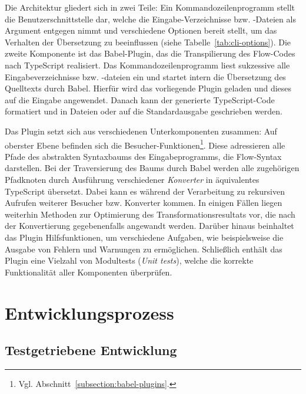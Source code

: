 Die Architektur gliedert sich in zwei Teile: Ein Kommandozeilenprogramm stellt die Benutzerschnittstelle dar, welche die Eingabe-Verzeichnisse bzw. -Dateien als Argument entgegen nimmt und verschiedene Optionen bereit stellt, um das Verhalten der Übersetzung zu beeinflussen (siehe Tabelle~\ref{tab:cli-options}). Die zweite Komponente ist das Babel-Plugin, das die Transpilierung des Flow-Codes nach TypeScript realisiert. Das Kommandozeilenprogramm liest sukzessive alle Eingabeverzeichnisse bzw. -dateien ein und startet intern die Übersetzung des Quelltexts durch Babel. Hierfür wird das vorliegende Plugin geladen und dieses auf die Eingabe angewendet. Danach kann der generierte TypeScript-Code formatiert und in Dateien oder auf die Standardausgabe geschrieben werden.

Das Plugin setzt sich aus verschiedenen Unterkomponenten zusammen: Auf oberster Ebene befinden sich die Besucher-Funktionen\footnote{Vgl. Abschnitt~\ref{subsection:babel-plugins}.}. Diese adressieren alle Pfade des abstrakten Syntaxbaums des Eingabeprogramms, die Flow-Syntax darstellen. Bei der Traversierung des Baums durch Babel werden alle zugehörigen Pfadknoten durch Ausführung verschiedener \emph{Konverter} in äquivalentes TypeScript übersetzt. Dabei kann es während der Verarbeitung zu rekursiven Aufrufen weiterer Besucher bzw. Konverter kommen. In einigen Fällen liegen weiterhin Methoden zur Optimierung des Transformationsresultats vor, die nach der Konvertierung gegebenenfalls angewandt werden. Darüber hinaus beinhaltet das Plugin Hilfsfunktionen, um verschiedene Aufgaben, wie beispielsweise die Ausgabe von Fehlern und Warnungen zu ermöglichen. Schließlich enthält das Plugin eine Vielzahl von Modultests (\textit{Unit tests}), welche die korrekte Funktionalität aller Komponenten überprüfen.

\section{Entwicklungsprozess}


\subsection{Testgetriebene Entwicklung}

